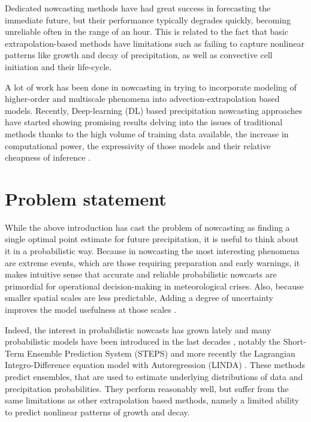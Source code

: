Dedicated nowcasting methods have had great success in forecasting the immediate future, but their performance typically degrades quickly, becoming unreliable often in the range of an hour. This is related to the fact that basic extrapolation-based methods have limitations such as failing to capture nonlinear patterns like growth and decay of precipitation, as well as convective cell initiation and their life-cycle. 

A lot of work has been done in nowcasting in trying to incorporate modeling of higher-order and multiscale phenomena into advection-extrapolation based models. Recently, Deep-learning (DL) based precipitation nowcasting approaches have started showing promising results delving into the issues of traditional methods thanks to the high volume of training data available, the increase in computational power, the expressivity of those models and their relative cheapness of inference \cite{shi_convolutional_2015,shi_deep_2017,ayzel_rainnet_nodate}.


\section{Problem statement}


While the above introduction has cast the problem of nowcasting as finding a single optimal point estimate for future precipitation, it is useful to think about it in a probabilistic way. Because in nowcasting the most interesting phenomena are extreme events, which are those requiring preparation and early warnings, it makes intuitive sense that accurate and reliable probabilistic nowcasts are primordial for operational decision-making in meteorological crises. Also, because smaller spatial scales are less predictable, Adding a degree of uncertainty improves the model usefulness at those scales \cite{germann2002scale}.

Indeed, the interest in probabilistic nowcasts has grown lately and many probabilistic models have been introduced in the last decades \cite{seed_formulation_2013, andersson1991model, schmid2002short, fox2005bayesian}, notably the Short-Term Ensemble Prediction System (STEPS) \cite{bowler_steps_2006} and more recently the Lagrangian Integro-Difference equation model with Autoregression (LINDA) \cite{pulkkinen_lagrangian_2021}. These methods predict ensembles, that are used to estimate underlying distributions of data and precipitation probabilities. They perform reasonably well, but  suffer from the same limitations as other extrapolation based methods, namely a limited ability to predict nonlinear patterns of growth and decay. 

